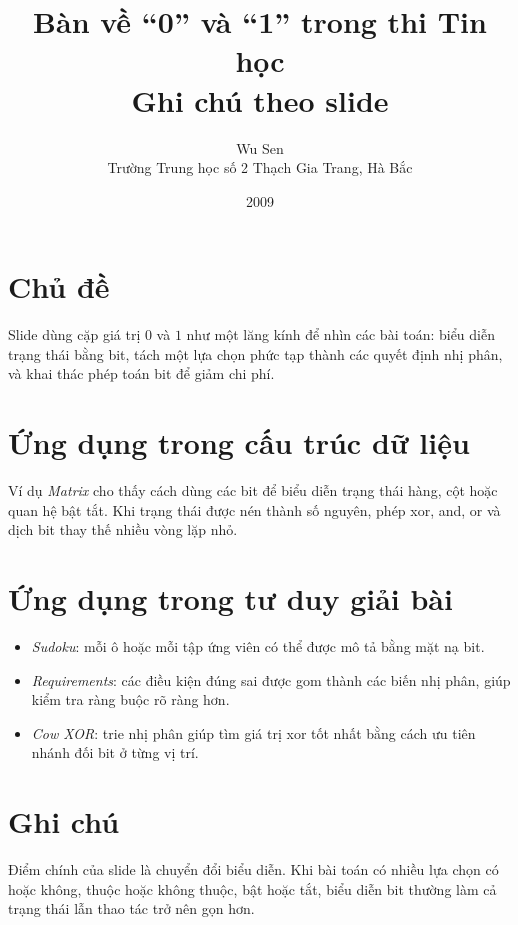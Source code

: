 \documentclass[11pt]{article}
\title{Bàn về ``0'' và ``1'' trong thi Tin học\\{\large Ghi chú theo slide}}
\author{Wu Sen\\Trường Trung học số 2 Thạch Gia Trang, Hà Bắc}
\date{2009}
\begin{document}
\maketitle


\section{Chủ đề}

Slide dùng cặp giá trị \(0\) và \(1\) như một lăng kính để nhìn các bài toán:
biểu diễn trạng thái bằng bit, tách một lựa chọn phức tạp thành các quyết định
nhị phân, và khai thác phép toán bit để giảm chi phí.

\section{Ứng dụng trong cấu trúc dữ liệu}

Ví dụ \textit{Matrix} cho thấy cách dùng các bit để biểu diễn trạng thái hàng,
cột hoặc quan hệ bật tắt. Khi trạng thái được nén thành số nguyên, phép xor,
and, or và dịch bit thay thế nhiều vòng lặp nhỏ.

\section{Ứng dụng trong tư duy giải bài}

\begin{itemize}
  \item \textit{Sudoku}: mỗi ô hoặc mỗi tập ứng viên có thể được mô tả bằng
  mặt nạ bit.
  \item \textit{Requirements}: các điều kiện đúng sai được gom thành các biến
  nhị phân, giúp kiểm tra ràng buộc rõ ràng hơn.
  \item \textit{Cow XOR}: trie nhị phân giúp tìm giá trị xor tốt nhất bằng
  cách ưu tiên nhánh đối bit ở từng vị trí.
\end{itemize}

\section{Ghi chú}

Điểm chính của slide là chuyển đổi biểu diễn. Khi bài toán có nhiều lựa chọn
có hoặc không, thuộc hoặc không thuộc, bật hoặc tắt, biểu diễn bit thường làm
cả trạng thái lẫn thao tác trở nên gọn hơn.
\end{document}
